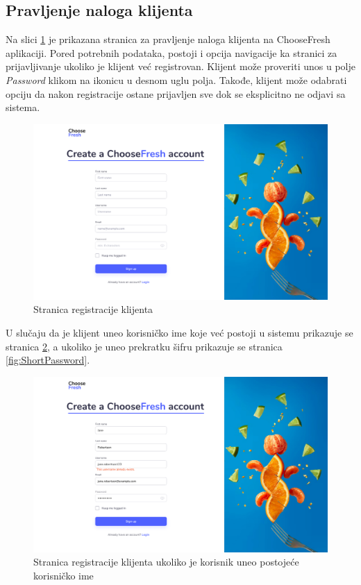 \subsection{Pravljenje naloga klijenta}

Na slici \ref{fig:SignUp} je prikazana stranica za pravljenje naloga klijenta na ChooseFresh aplikaciji. Pored potrebnih podataka, postoji i opcija navigacije ka stranici za prijavljivanje ukoliko je klijent već registrovan. Klijent može proveriti unos u polje \textit{Password} klikom na ikonicu u desnom uglu polja. Takođe, klijent može odabrati opciju da nakon registracije ostane prijavljen sve dok se eksplicitno ne odjavi sa sistema.

\begin{figure}[H]
	\begin{center}
		\includegraphics[width=\textwidth]{UI/SignUp.jpg}
    		\caption{Stranica registracije klijenta}
    \label{fig:SignUp}
    \end{center}
\end{figure}


U slučaju da je klijent uneo korisničko ime koje već postoji u sistemu prikazuje se stranica \ref{fig:UsernameExists}, a ukoliko je uneo prekratku šifru prikazuje se stranica \ref{fig:ShortPassword}.

\begin{figure}[H]
	\begin{center}
		\includegraphics[width=\textwidth]{UI/UsernameExistsSignUp.jpg}
    		\caption{Stranica registracije klijenta ukoliko je korisnik uneo postojeće korisničko ime}
    \label{fig:UsernameExists}
    \end{center}
\end{figure}

